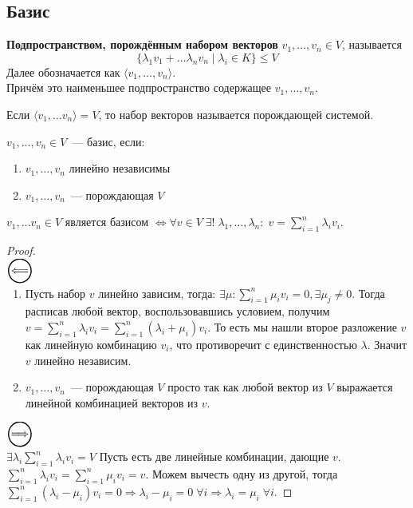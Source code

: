 \subsection{Базис}
\begin{definition}
    \textbf{Подпространством, порождённым набором векторов} $v_1, \dots, v_n\in V$, называется
    $$\{\lambda_1v_1 + \dots \lambda_nv_n \mid \lambda_i\in K\}\le V$$
    Далее обозначается как $\langle v_1,\dots, v_n\rangle$.\\
    \notice Причём это наименьшее подпространство содержащее $v_1,\dots,v_n$.
\end{definition}
\begin{definition}
    Если $\langle v_1,\dots v_n\rangle = V$, то набор векторов называется
    порождающей системой.
\end{definition}
\begin{definition}
    $v_1, \dots, v_n\in V$~--- базис, если:
    \begin{enumerate}
        \item $v_1,\dots,v_n$ линейно независимы
        \item $v_1,\dots, v_n$~--- порождающая $V$
    \end{enumerate}
\end{definition}
\begin{lemma}
    $v_1,\dots v_n \in V$ является базисом $\Leftrightarrow \forall v\in V \; \exists !\;
    \lambda_1,\dots,\lambda_n\colon\; v = \sum_{i=1}^{n}\lambda_iv_i$.
\end{lemma}
\begin{proof} \leavevmode\\
    $\ola$
    \begin{enumerate}
        \item Пусть набор $v$ линейно зависим, тогда: $\exists \mu \colon \sum_{i=1}^{n}\mu_iv_i=0, \exists \mu_j\not=0$.
            Тогда расписав любой вектор, воспользовавшись условием, получим 
            $v = \sum_{i=1}^{n}\lambda_iv_i = \sum_{i=1}^{n}(\lambda_i+\mu_i)v_i$. То есть мы нашли
            второе разложение $v$ как линейную комбинацию $v_i$, что противоречит с единственностью $\lambda$.
            Значит $v$ линейно независим.
        \item $v_1,\dots, v_n$~--- порождающая $V$ просто так как любой вектор из $V$ выражается
            линейной комбинацией векторов из $v$.
    \end{enumerate}
    $\ora$

    $\exists \lambda_i \sum_{i=1}^{n} \lambda_iv_i = V$
    Пусть есть две линейные комбинации, дающие $v$.
    $\sum_{i=1}^{n} \lambda_iv_i = \sum_{i=1}^{n} \mu_iv_i = v$. Можем вычесть одну из другой, тогда
    $\sum_{i=1}^{n}(\lambda_i - \mu_i)v_i = 0\Rightarrow \lambda_i-\mu_i=0\;\forall i
    \Rightarrow \lambda_i = \mu_i\;\forall i$.
\end{proof}


